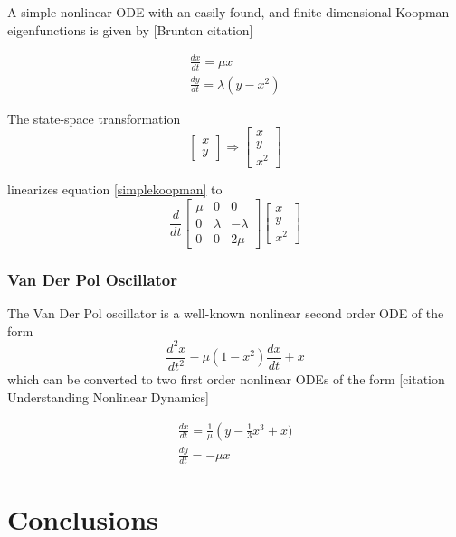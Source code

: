 \documentclass{article}
\begin{document}
A simple nonlinear ODE with an easily found, and finite-dimensional Koopman eigenfunctions is given by [Brunton citation]

\begin{align}
  \label{simplekoopman}
\frac{dx}{dt} = \mu x \\
\frac{dy}{dt} = \lambda(y - x^2)
\end{align}

The state-space transformation
\[ \begin{bmatrix}
x\\
y
\end{bmatrix} \Rightarrow \begin{bmatrix}
x \\
y \\
x^2
\end{bmatrix}
\]

linearizes equation \ref{simplekoopman} to
\[ \frac{d}{dt} \begin{bmatrix}
\mu & 0 & 0 \\
0 & \lambda & -\lambda \\
0 & 0 & 2 \mu
\end{bmatrix} \begin{bmatrix}
x \\
y \\
x^2
\end{bmatrix}
\]







\subsubsection{Van Der Pol Oscillator}
The Van Der Pol oscillator is a well-known nonlinear second order ODE of the form
\[ \frac{d^2 x}{dt^2} - \mu (1- x^2) \frac{dx}{dt} + x \]
which can be converted to two first order nonlinear ODEs of the form [citation Understanding Nonlinear Dynamics]

\begin{align}
  \frac{dx}{dt} = \frac{1}{\mu}\left(y - \frac{1}{3} x^3 + x) \\
  \frac{dy}{dt} = -\mu x
\end{align}




\section{Conclusions}




\nocite{langley00}



\end{document}

